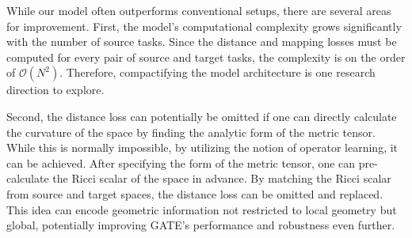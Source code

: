 While our model often outperforms conventional setups, there are several areas for improvement. First, the model's computational complexity grows significantly with the number of source tasks. Since the distance and mapping losses must be computed for every pair of source and target tasks, the complexity is on the order of $\mathcal{O}(N^2)$. Therefore, compactifying the model architecture is one research direction to explore.

Second, the distance loss can potentially be omitted if one can directly calculate the curvature of the space by finding the analytic form of the metric tensor. While this is normally impossible, by utilizing the notion of operator learning, it can be achieved. After specifying the form of the metric tensor, one can pre-calculate the Ricci scalar of the space in advance. By matching the Ricci scalar from source and target spaces, the distance loss can be omitted and replaced. This idea can encode geometric information not restricted to local geometry but global, potentially improving GATE's performance and robustness even further.







 
 
















                

































